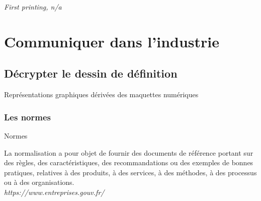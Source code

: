 \documentclass[
	11pt, %
	fleqn, %
	a4paper, %
]{LegrandOrangeBook}
\begin{document}
\noindent \textit{First printing, n/a} %


\pagestyle{empty} %

\tableofcontents %

\listoffigures %

\listoftables %

\pagestyle{fancy} %

\cleardoublepage %


\part{Communiquer dans l'industrie}


\chapterspaceabove{6.75cm} %
\chapterspacebelow{7.25cm} %


\chapter{Décrypter le dessin de définition}
\begin{corollary}[S2.4] 
Représentations graphiques dérivées des maquettes numériques
\end{corollary}


\section{Les normes}
\begin{definition}{Normes}

    La normalisation a pour objet de fournir des documents de référence portant sur des règles, des caractéristiques, des recommandations ou des exemples de bonnes pratiques, relatives à des produits, à des services, à des méthodes, à des processus ou à des organisations.\\ \textit{https://www.entreprises.gouv.fr/}
\end{definition}
\end{document}
